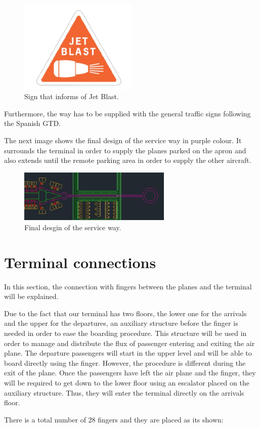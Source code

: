  	\begin{figure}[H]
	\centering
	\includegraphics[clip, trim=0cm 0cm 0cm 0cm, width=0.5\textwidth]{./images/serviceway/sign2}
	\caption{Sign that informs of Jet Blast.} %
	\label{} %
	\end{figure} 
	
	
	Furthermore, the way has to be supplied with the general traffic signs following the Spanish GTD. 
	
	The next image shows the final design of the service way in purple colour. It surrounds the terminal in order to supply the planes parked on the apron and also extends until the remote parking area in order to supply the other aircraft.
	
	\begin{figure}[H]
		\centering
		\includegraphics[clip, trim=0cm 0cm 0cm 0cm, angle=90, width=0.65\textwidth]{./images/serviceway/serviceway}
		\caption{Final desgin of the service way.} %
		\label{} %
	\end{figure} 
	
	\section{Terminal connections}
	In this section, the connection with fingers between the planes and the terminal will be explained. 
	
	Due to the fact that our terminal has two floors, the lower one for the arrivals and the upper for the departures, an auxiliary structure before the finger is needed in order to ease the boarding procedure. This structure will be used in order to manage and distribute the flux of passenger entering and exiting the air plane. The departure passengers will start in the upper level and will be able to board directly using the finger. However, the procedure is different during the exit of the plane. Once the passengers have left the air plane and the finger, they will be required to get down to the lower floor using an escalator placed on the auxiliary structure. Thus, they will enter the terminal directly on the arrivals floor.
	
	There is a total number of 28 fingers and they are placed as its shown:
	
	
	